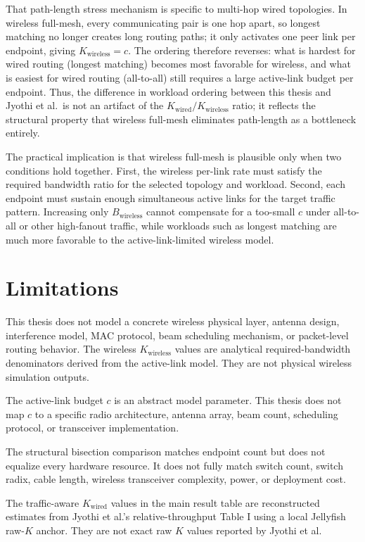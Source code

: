 \documentclass[conference]{IEEEtran}
\begin{document}
That path-length stress mechanism is specific to multi-hop wired topologies. In wireless full-mesh, every communicating pair is one hop apart, so longest matching no longer creates long routing paths; it only activates one peer link per endpoint, giving \(K_{\mathrm{wireless}}=c\). The ordering therefore reverses: what is hardest for wired routing (longest matching) becomes most favorable for wireless, and what is easiest for wired routing (all-to-all) still requires a large active-link budget per endpoint. Thus, the difference in workload ordering between this thesis and Jyothi et al.\ is not an artifact of the \(K_{\mathrm{wired}}/K_{\mathrm{wireless}}\) ratio; it reflects the structural property that wireless full-mesh eliminates path-length as a bottleneck entirely.

The practical implication is that wireless full-mesh is plausible only when two conditions hold together. First, the wireless per-link rate must satisfy the required bandwidth ratio for the selected topology and workload. Second, each endpoint must sustain enough simultaneous active links for the target traffic pattern. Increasing only \(B_{\mathrm{wireless}}\) cannot compensate for a too-small \(c\) under all-to-all or other high-fanout traffic, while workloads such as longest matching are much more favorable to the active-link-limited wireless model.

\section{Limitations}

This thesis does not model a concrete wireless physical layer, antenna design, interference model, MAC protocol, beam scheduling mechanism, or packet-level routing behavior. The wireless \(K_{\mathrm{wireless}}\) values are analytical required-bandwidth denominators derived from the active-link model. They are not physical wireless simulation outputs.

The active-link budget \(c\) is an abstract model parameter. This thesis does not map \(c\) to a specific radio architecture, antenna array, beam count, scheduling protocol, or transceiver implementation.

The structural bisection comparison matches endpoint count but does not equalize every hardware resource. It does not fully match switch count, switch radix, cable length, wireless transceiver complexity, power, or deployment cost.

The traffic-aware \(K_{\mathrm{wired}}\) values in the main result table are reconstructed estimates from Jyothi et al.'s relative-throughput Table I using a local Jellyfish raw-\(K\) anchor. They are not exact raw \(K\) values reported by Jyothi et al.
\end{document}
